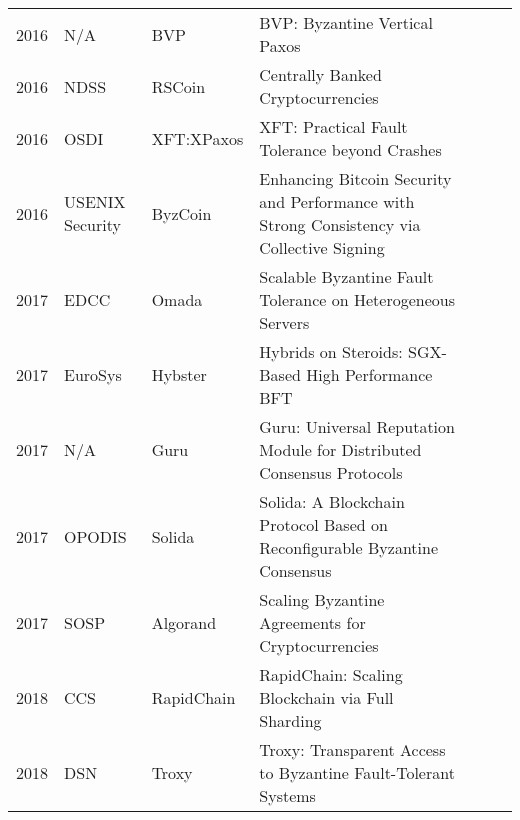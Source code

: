 \documentclass{article}
\begin{document}
\begin{landscape}
\begin{table}[]
{\begin{tabular}{llll|l|l|l|}
2016 & N/A               & BVP                     & BVP: Byzantine Vertical Paxos                                                             &            &          &              \\ \cline{5-7} 
2016 & NDSS              & RSCoin                  & Centrally Banked Cryptocurrencies                                                         &            &          &              \\ \cline{5-7} 
2016 & OSDI              & XFT:XPaxos              & XFT: Practical Fault Tolerance beyond Crashes                                             &            &          &              \\ \cline{5-7} 
2016 & USENIX Security   & ByzCoin                 & Enhancing Bitcoin Security and Performance with Strong Consistency via Collective Signing &            &          &              \\ \cline{5-7} 
2017 & EDCC              & Omada                   & Scalable Byzantine Fault Tolerance on Heterogeneous Servers                               &            &          &              \\ \cline{5-7} 
2017 & EuroSys           & Hybster                 & Hybrids on Steroids: SGX-Based High Performance BFT                                       &            &          &              \\ \cline{5-7} 
2017 & N/A               & Guru                    & Guru: Universal Reputation Module for Distributed Consensus Protocols                     &            &          &              \\ \cline{5-7} 
2017 & OPODIS            & Solida                  & Solida: A Blockchain Protocol Based on Reconfigurable Byzantine Consensus                 &            &          &              \\ \cline{5-7} 
2017 & SOSP              & Algorand                & Scaling Byzantine Agreements for Cryptocurrencies                                         &            &          &              \\ \cline{5-7} 
2018 & CCS               & RapidChain              & RapidChain: Scaling Blockchain via Full Sharding                                          &            &          &              \\ \cline{5-7} 
2018 & DSN               & Troxy                   & Troxy: Transparent Access to Byzantine Fault-Tolerant Systems                             &            &          &              \\ \cline{5-7} 

\end{tabular}}
\end{table}
\end{landscape}
\end{document}
